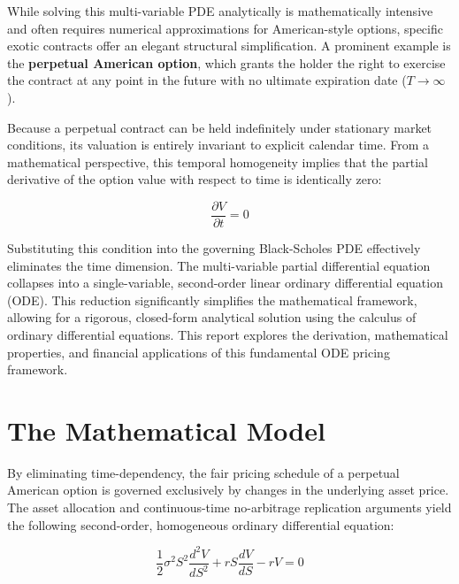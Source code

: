 \documentclass[12pt]{article}
\theoremstyle{definition}
\numberwithin{equation}{section}
\begin{document}
While solving this multi-variable PDE analytically is mathematically intensive and often requires numerical approximations for American-style options, specific exotic contracts offer an elegant structural simplification. A prominent example is the \textbf{perpetual American option}, which grants the holder the right to exercise the contract at any point in the future with no ultimate expiration date ($T \to \infty$).

Because a perpetual contract can be held indefinitely under stationary market conditions, 
its valuation is entirely invariant to explicit calendar time. From a mathematical perspective, this temporal homogeneity implies that the partial derivative of the option value with respect to time is identically zero:

\begin{equation}\label{eq:time_derivative_zero}
\frac{\partial V}{\partial t} = 0
\end{equation}

Substituting this condition into the governing Black-Scholes PDE effectively eliminates the time dimension. The multi-variable partial differential equation collapses into a single-variable, second-order linear ordinary differential equation (ODE). This reduction significantly simplifies the mathematical framework, allowing for a rigorous, closed-form analytical solution using the calculus of ordinary differential equations. This report explores the derivation, mathematical properties, and financial applications of this fundamental ODE pricing framework.

\vfill\pagebreak

\section{The Mathematical Model}

By eliminating time-dependency, the fair pricing schedule of a perpetual American option is governed exclusively by changes in the underlying asset price. The asset allocation and continuous-time no-arbitrage replication arguments yield the following second-order, homogeneous ordinary differential equation:

\begin{equation}\label{eq:black_scholes_ode}
\frac{1}{2}\sigma^2 S^2 \frac{d^2 V}{dS^2} + rS \frac{dV}{dS} - rV = 0
\end{equation}
\end{document}
